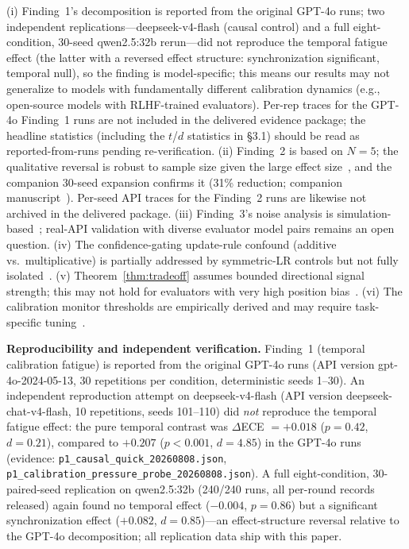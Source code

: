 \documentclass[11pt]{article}
\theoremstyle{definition}
\theoremstyle{remark}
\begin{document}
(i) Finding~1's decomposition is reported from the original GPT-4o runs; two independent replications---deepseek-v4-flash (causal control) and a full eight-condition, 30-seed qwen2.5:32b rerun---did not reproduce the temporal fatigue effect (the latter with a reversed effect structure: synchronization significant, temporal null), so the finding is model-specific; this means our results may not generalize to models with fundamentally different calibration dynamics (e.g., open-source models with RLHF-trained evaluators). Per-rep traces for the GPT-4o Finding~1 runs are not included in the delivered evidence package; the headline statistics (including the $t$/$d$ statistics in \S3.1) should be read as reported-from-runs pending re-verification. (ii) Finding~2 is based on $N{=}5$; the qualitative reversal is robust to sample size given the large effect size~\citep{lehmann1998theory}, and the companion 30-seed expansion confirms it (31\% reduction; companion manuscript~\citep{companion2026}). Per-seed API traces for the Finding~2 runs are likewise not archived in the delivered package. (iii) Finding~3's noise analysis is simulation-based~\citep{resampling2026}; real-API validation with diverse evaluator model pairs remains an open question. (iv) The confidence-gating update-rule confound (additive vs.\ multiplicative) is partially addressed by symmetric-LR controls but not fully isolated~\citep{boundarysync2026}. (v) Theorem~\ref{thm:tradeoff} assumes bounded directional signal strength; this may not hold for evaluators with very high position bias~\citep{tversky1974anchoring}. (vi) The calibration monitor thresholds are empirically derived and may require task-specific tuning~\citep{naeini2015obtaining,jiang2021can}.



\textbf{Reproducibility and independent verification.} Finding~1 (temporal calibration fatigue) is reported from the original GPT-4o runs (API version gpt-4o-2024-05-13, 30 repetitions per condition, deterministic seeds 1--30). An independent reproduction attempt on deepseek-v4-flash (API version deepseek-chat-v4-flash, 10 repetitions, seeds 101--110) did \textit{not} reproduce the temporal fatigue effect: the pure temporal contrast was $\Delta$ECE $= +0.018$ ($p = 0.42$, $d = 0.21$), compared to $+0.207$ ($p < 0.001$, $d = 4.85$) in the GPT-4o runs (evidence: \texttt{p1\_causal\_quick\_20260808.json}, \texttt{p1\_calibration\_pressure\_probe\_20260808.json}). A full eight-condition, 30-paired-seed replication on qwen2.5:32b (240/240 runs, all per-round records released) again found no temporal effect ($-0.004$, $p = 0.86$) but a significant synchronization effect ($+0.082$, $d = 0.85$)---an effect-structure reversal relative to the GPT-4o decomposition; all replication data ship with this paper.
\end{document}
